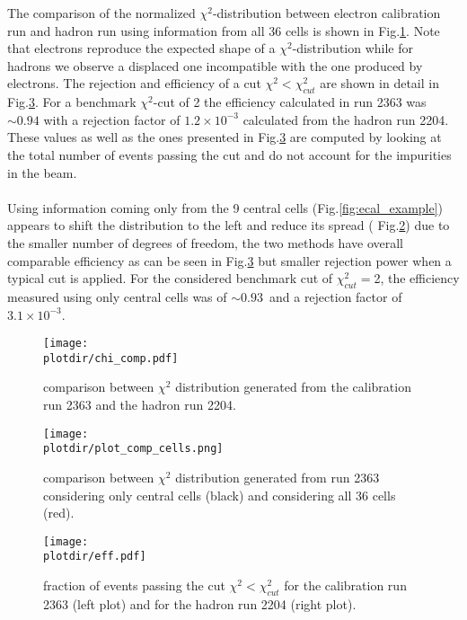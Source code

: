 The comparison of the normalized $\chi^2$-distribution between
electron calibration run and hadron run using information from all 36
cells is shown in Fig.\ref{fig:chi2}. Note that electrons reproduce
the expected shape of a $\chi^2$-distribution while for hadrons we
observe a displaced one incompatible with the one produced by
electrons.  The rejection and efficiency of a cut
$\chi^2 < \chi^2_{cut}$ are shown in detail in Fig.\ref{fig:eff}. For
a benchmark $\chi^2$-cut of 2 the efficiency calculated in run 2363
was $\sim 0.94$ with a rejection factor of $1.2\times 10^{-3}$
calculated from the hadron run 2204. These values as well as the ones
presented in Fig.\ref{fig:eff} are computed by looking at the total
number of events passing the cut and do not account for the impurities
in the beam.
\\
\\
Using information coming only from the 9 central
cells (Fig.\ref{fig:ecal_example}) appears to shift the distribution
to the left and reduce its spread ( Fig.\ref{fig:chi}) due to the
smaller number of degrees of freedom, the two methods have overall
comparable efficiency as can be seen in Fig.\ref{fig:eff} but smaller
rejection power when a typical cut is applied.  For the considered
benchmark cut of $\chi^2_{cut}=$2, the efficiency measured using only
central cells was of $\sim 0.93$\ and a rejection factor of
$3.1\times 10^{-3}$.


\begin{figure}[h!]
  \begin{center}
    \texttt{[image: \\plotdir/chi\_comp.pdf]}
  \end{center}
  \caption{comparison between $\chi^2$ distribution generated from the
    calibration run 2363 and the hadron run 2204.}
  \label{fig:chi2}
\end{figure}

\begin{figure}[h!]
  \begin{center}
    \texttt{[image: \\plotdir/plot\_comp\_cells.png]}
  \end{center}
  \caption{comparison between $\chi^2$ distribution generated from run
    2363 considering only central cells (black) and considering all 36
    cells (red).}
  \label{fig:chi}
\end{figure}

\begin{figure}[h!]
  \begin{center}
    \texttt{[image: \\plotdir/eff.pdf]}
  \end{center}
  \caption{fraction of events passing the cut $\chi^2 < \chi^2_{cut}$
    for the calibration run 2363 (left plot) and for the hadron run
    2204 (right plot).}
  \label{fig:eff}
\end{figure}

